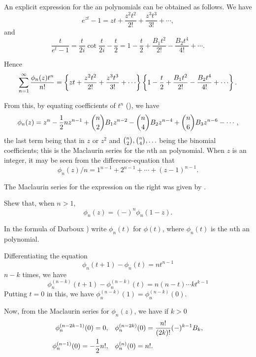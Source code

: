 An explicit expression for the \Bernoulli an polynomials can be obtained
as follows. We have
$$
e^{zt} - 1
=
zt
+ \frac{z^{2}t^{2}}{2!}
+ \frac{z^{3}t^{3}}{3!}
+ \cdots,
$$
and
$$
\frac{t}{e^{t}-1}
=
\frac{t}{2i} \cot \frac{t}{2i} - \frac{t}{2}
=
1 
- \frac{t}{2}
+ \frac{B_{1} t^{2}}{2!}
- \frac{B_{2} t^{4}}{4!}
+ \cdots.
$$

Hence
$$
\sum_{n=1}^{\infty}
\frac{\phi_{n}(z) t^{n}}{n!}
=
\thebrace{
  zt
  + \frac{z^{2} t^{2}}{2!}
  + \frac{z^{3} t^{3}}{3!}
  + \cdots
}
\thebrace{
  1
  - \frac{t}{2}
  + \frac{B_{1} t^{2}}{2!}
  - \frac{B_{2} t^{4}}{4!}
  + \cdots
}.
$$

From this, by equating coefficients of $t^{n}$
(), we have
$$
\phi_{n}(z)
=
z^{n}
- \frac{1}{2} n z^{n-1}
+ \binom{n}{2} B_{1} z^{n-2}
- \binom{n}{4} B_{2} z^{n-4}
+ \binom{n}{6} B_{3} z^{n-6}
- \cdots,
$$
the last term being that in $z$ or $z^{2}$ and 
$\binom{n}{2}, \binom{n}{4},\ldots$  being the
binomial coefficients; this is the Maclaurin series for the $n$th
\Bernoulli an polynomial.
When $z$ is an integer, it may be seen from the difference-equation that
$$
\phi_{n}(z)/n
=
1^{n-1}
+ 2^{n-1}
+ \cdots + (z-1)^{n-1}.
$$

The Maclaurin series for the
expression on the right was given by \Bernoulli. 

\begin{wandwexample}
  Shew that, when $n > 1$,
  $$
  \phi_{n}(z) = (-)^{n} \phi_{n}(1-z).
  $$
\end{wandwexample}

In the formula of Darboux ) write $\phi_{n}(t)$
for $\phi(t)$, where $\phi_{n}(t)$ is the $n$th \Bernoulli an polynomial.

Differentiating the equation
$$
\phi_{n}(t+1) - \phi_{n}(t) = n t^{n-1}
$$
$n - k$ times, we have
$$
\phi_{n}^{(n-k)}(t+1) - \phi_{n}^{(n-k)}(t)
=
n (n-t) \cdots k t^{k-1}
$$
Putting $t=0$ in this, we have
$\phi_{n}^{(n-k)}(1) = \phi_{n}^{(n-k)}(0).$

Now, from the Maclaurin
series for $\phi_{n}(z)$, we have if $k > 0$
\begin{align*}
  \phi_{n}^{(n-2k-1)}(0) = 0,
  &
  \quad
  \phi_{n}^{(n-2k)}(0) = \frac{n!}{(2k)!} (-)^{k-1} B_{k},
  \\
  \phi_{n}^{(n-1)}(0) = -\frac{1}{2} n!,
  &
  \quad
  \phi_{n}^{(n)}(0) = n!.
\end{align*}

